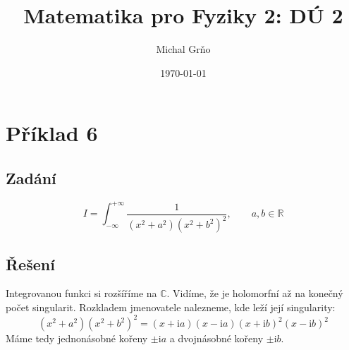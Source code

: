 \documentclass[10pt,a4paper]{article}
\newcommand{\const}[1]{\text{#1}}
\renewcommand{\i}{\const{i}}
\begin{document}
\title{Matematika pro Fyziky 2: DÚ 2}
\author{Michal Grňo}
\date{\today}

\maketitle

\section{Příklad 6}
\subsection{Zadání}
\begin{equation*}
    I = \int_{-\infty}^{+\infty} \frac{1}{(x^2+a^2)(x^2+b^2)^2},
    \hspace{2em}
    a, b \in \mathbb{R}
\end{equation*}
\subsection{Řešení}
Integrovanou funkci si rozšíříme na $\mathbb{C}$. Vidíme, že je holomorfní až na konečný počet singularit. Rozkladem jmenovatele nalezneme, kde leží její singularity:
\begin{equation*}
    (x^2+a^2)(x^2+b^2)^2 = (x+\i a)(x-\i a)(x+\i b)^2(x-\i b)^2
\end{equation*}
Máme tedy jednonásobné kořeny $\pm \i a$ a dvojnásobné kořeny $\pm \i b$.
\end{document}
